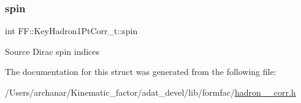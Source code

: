 \subsubsection{\texorpdfstring{spin}{spin}}
{\footnotesize\ttfamily int F\+F\+::\+Key\+Hadron1\+Pt\+Corr\+\_\+t\+::spin}

Source Dirac spin indices 

The documentation for this struct was generated from the following file\+:\begin{DoxyCompactItemize}
\item 
/\+Users/archanar/\+Kinematic\+\_\+factor/adat\+\_\+devel/lib/formfac/\mbox{\hyperlink{lib_2formfac_2hadron__1pt__corr_8h}{hadron\+\_\+1pt\+\_\+corr.\+h}}\end{DoxyCompactItemize}
